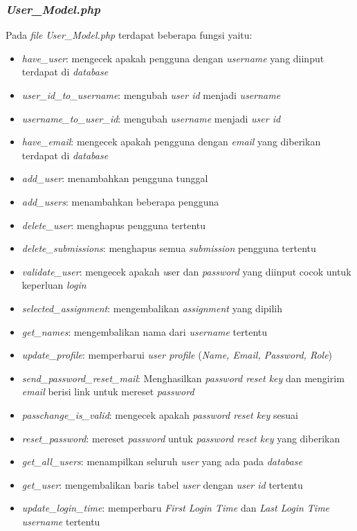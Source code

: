 \subsubsection{\textit{User\_Model.php}}
Pada \textit{file} \textit{User\_Model.php} terdapat beberapa fungsi yaitu:
\begin{itemize}
	\item \textit{have\_user}: mengecek apakah pengguna dengan \textit{username} yang diinput terdapat di \textit{database}
	\item \textit{user\_id\_to\_username}: mengubah \textit{user id} menjadi \textit{username}
	\item \textit{username\_to\_user\_id}: mengubah \textit{username} menjadi \textit{user id}
	\item \textit{have\_email}: mengecek apakah pengguna dengan \textit{email} yang diberikan terdapat di \textit{database}
	\item \textit{add\_user}: menambahkan pengguna tunggal
	\item \textit{add\_users}: menambahkan beberapa pengguna
	\item \textit{delete\_user}: menghapus pengguna tertentu
	\item \textit{delete\_submissions}: menghapus semua \textit{submission} pengguna tertentu
	\item \textit{validate\_user}: mengecek apakah \textit{u}ser dan \textit{password} yang diinput cocok untuk keperluan \textit{login}
	\item \textit{selected\_assignment}: mengembalikan \textit{assignment} yang dipilih
	\item \textit{get\_names}: mengembalikan nama dari \textit{username} tertentu
	\item \textit{update\_profile}: memperbarui \textit{user profile} (\textit{Name, Email, Password, Role})
	\item \textit{send\_password\_reset\_mail}: Menghasilkan \textit{password reset key} dan mengirim \textit{email} berisi link untuk mereset \textit{password}
	\item \textit{passchange\_is\_valid}: mengecek apakah \textit{password reset key} sesuai
	\item \textit{reset\_password}: mereset \textit{password} untuk\textit{ password reset key} yang diberikan
	\item \textit{get\_all\_users}: menampilkan seluruh \textit{user} yang ada pada \textit{database}
	\item \textit{get\_user}: mengembalikan baris tabel \textit{user} dengan \textit{user id} tertentu
	\item \textit{update\_login\_time}: memperbaru \textit{First Login Time} dan \textit{Last Login Time username} tertentu	
\end{itemize}

